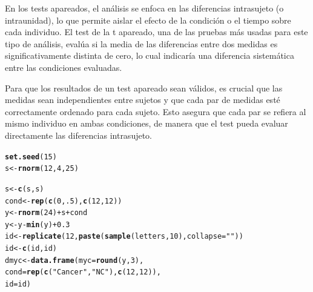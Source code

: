 \documentclass{config/apuntes}\usepackage[]{graphicx}\usepackage[]{xcolor}
\makeatletter
\newcommand{\hlnum}[1]{\textcolor[rgb]{0.686,0.059,0.569}{#1}}%
\newcommand{\hlsng}[1]{\textcolor[rgb]{0.192,0.494,0.8}{#1}}%
\newcommand{\hlopt}[1]{\textcolor[rgb]{0,0,0}{#1}}%
\newcommand{\hldef}[1]{\textcolor[rgb]{0.345,0.345,0.345}{#1}}%
\newcommand{\hlkwb}[1]{\textcolor[rgb]{0.69,0.353,0.396}{#1}}%
\newcommand{\hlkwc}[1]{\textcolor[rgb]{0.333,0.667,0.333}{#1}}%
\newcommand{\hlkwd}[1]{\textcolor[rgb]{0.737,0.353,0.396}{\textbf{#1}}}%
\newenvironment{kframe}{%
 \def\at@end@of@kframe{}%
 \ifinner\ifhmode%
  \def\at@end@of@kframe{\end{minipage}}%
  \begin{minipage}{\columnwidth}%
 \fi\fi%
 \def\FrameCommand##1{\hskip\@totalleftmargin \hskip-\fboxsep
 \colorbox{shadecolor}{##1}\hskip-\fboxsep
     \hskip-\linewidth \hskip-\@totalleftmargin \hskip\columnwidth}%
 \MakeFramed {\advance\hsize-\width
   \@totalleftmargin\z@ \linewidth\hsize
   \@setminipage}}%
 {\par\unskip\endMakeFramed%
 \at@end@of@kframe}
\newenvironment{knitrout}{}{} %
\makeatother
\begin{document}
En los tests apareados, el análisis se enfoca en las diferencias intrasujeto (o intraunidad), lo que permite aislar el efecto de la condición o el tiempo sobre cada individuo. El test de la t apareado, una de las pruebas más usadas para este tipo de análisis, evalúa si la media de las diferencias entre dos medidas es significativamente distinta de cero, lo cual indicaría una diferencia sistemática entre las condiciones evaluadas.

Para que los resultados de un test apareado sean válidos, es crucial que las medidas sean independientes entre sujetos y que cada par de medidas esté correctamente ordenado para cada sujeto. Esto asegura que cada par se refiera al mismo individuo en ambas condiciones, de manera que el test pueda evaluar directamente las diferencias intrasujeto.

\begin{knitrout}
\color{fgcolor}\begin{kframe}
\begin{alltt}
\hlkwd{set.seed}\hldef{(}\hlnum{15}\hldef{)}
\hldef{s} \hlkwb{<-} \hlkwd{rnorm}\hldef{(}\hlnum{12}\hldef{,} \hlnum{4}\hldef{,} \hlnum{25}\hldef{)}

\hldef{s} \hlkwb{<-} \hlkwd{c}\hldef{(s, s)}
\hldef{cond} \hlkwb{<-} \hlkwd{rep}\hldef{(}\hlkwd{c}\hldef{(}\hlnum{0}\hldef{,} \hlnum{.5}\hldef{),} \hlkwd{c}\hldef{(}\hlnum{12}\hldef{,} \hlnum{12}\hldef{))}
\hldef{y} \hlkwb{<-} \hlkwd{rnorm}\hldef{(}\hlnum{24}\hldef{)} \hlopt{+} \hldef{s} \hlopt{+} \hldef{cond}
\hldef{y} \hlkwb{<-} \hldef{y} \hlopt{-} \hlkwd{min}\hldef{(y)} \hlopt{+} \hlnum{0.3}
\hldef{id} \hlkwb{<-} \hlkwd{replicate}\hldef{(}\hlnum{12}\hldef{,} \hlkwd{paste}\hldef{(}\hlkwd{sample}\hldef{(letters,} \hlnum{10}\hldef{),} \hlkwc{collapse} \hldef{=} \hlsng{""}\hldef{))}
\hldef{id} \hlkwb{<-} \hlkwd{c}\hldef{(id, id)}
\hldef{dmyc} \hlkwb{<-} \hlkwd{data.frame}\hldef{(}\hlkwc{myc} \hldef{=} \hlkwd{round}\hldef{(y,} \hlnum{3}\hldef{),}
                   \hlkwc{cond} \hldef{=} \hlkwd{rep}\hldef{(}\hlkwd{c}\hldef{(}\hlsng{"Cancer"}\hldef{,} \hlsng{"NC"}\hldef{),} \hlkwd{c}\hldef{(}\hlnum{12}\hldef{,} \hlnum{12}\hldef{)),}
                   \hlkwc{id} \hldef{= id)}
\end{alltt}
\end{kframe}
\end{knitrout}
\end{document}
